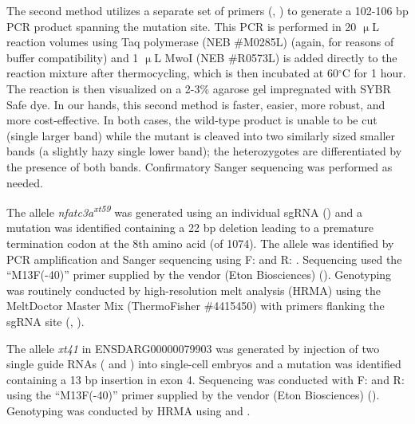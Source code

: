 The second method utilizes a separate set of primers (, ) to generate a 102\hyp{}106 bp PCR product spanning the mutation site. This PCR is performed in 20 $\upmu$L reaction volumes using Taq polymerase (NEB \#M0285L) (again, for reasons of buffer compatibility) and 1 $\upmu$L MwoI (NEB \#R0573L) is added directly to the reaction mixture after thermocycling, which is then incubated at 60$^{\circ}$C for 1 hour. The reaction is then visualized on a 2\hyp{}3\% agarose gel impregnated with SYBR Safe dye. In our hands, this second method is faster, easier, more robust, and more cost\hyp{}effective. In both cases, the wild\hyp{}type product is unable to be cut (single larger band) while the mutant is cleaved into two similarly sized smaller bands (a slightly hazy single lower band); the heterozygotes are differentiated by the presence of both bands. Confirmatory Sanger sequencing was performed as needed.

The allele \textit{nfatc3a\textsuperscript{xt59}} was generated using an individual sgRNA () and a mutation was identified containing a 22 bp deletion leading to a premature termination codon at the 8th amino acid (of 1074). The allele was identified by PCR amplification and Sanger sequencing using F:  and R: . Sequencing used the ``M13F(\hyp{}40)'' primer supplied by the vendor (Eton Biosciences) (). Genotyping was routinely conducted by high\hyp{}resolution melt analysis (HRMA) using the MeltDoctor Master Mix (ThermoFisher \#4415450) with primers flanking the sgRNA site (, ). 

The allele \textit{xt41} in ENSDARG00000079903 was generated by injection of two single guide RNAs ( and ) into single-cell embryos and a mutation was identified containing a 13 bp insertion in exon 4. Sequencing was conducted with F:  and R:  using the ``M13F(\hyp{}40)'' primer supplied by the vendor (Eton Biosciences) (). Genotyping was conducted by HRMA using  and .


